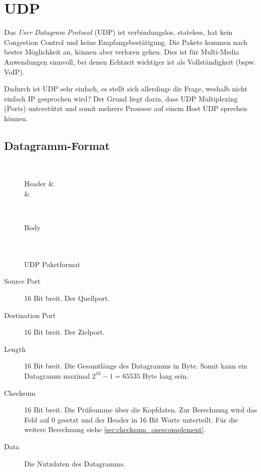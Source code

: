 \documentclass[a4paper, 11pt, accentcolor = tud3b]{tudreport}
\begin{document}
        \section{UDP}
            Das \textit{User Datagram Protocol} (UDP) ist verbindungslos, stateless, hat kein Congestion Control und keine Empfangsbestätigung. Die Pakete kommen nach bester Möglichkeit an, können aber verloren gehen. Dies ist für Multi-Media Anwendungen sinnvoll, bei denen Echtzeit wichtiger ist als Vollständigkeit (bspw. VoIP).
            
            Dadurch ist UDP sehr einfach, es stellt sich allerdings die Frage, weshalb nicht einfach IP gesprochen wird? Der Grund liegt darin, dass UDP Multiplexing (Ports) unterstützt und somit mehrere Prozesse auf einem Host UDP sprechen können.

            \subsection{Datagramm-Format}
	            \begin{figure}[H]
	            	\centering
	            	\begin{bytefield}[bitwidth = 1.2em]{32}
	            		 \\
	            		\begin{rightwordgroup}{Header}
	            			 &  \\
	            			 & 
	            		\end{rightwordgroup} \\
	            		\begin{rightwordgroup}{Body}
		            		 \\
		            		 \\
		            		 \\
	            		\end{rightwordgroup}
	            	\end{bytefield}
	            	\caption{UDP Paketformat}
	            	\label{fig:udp_packet}
	            \end{figure}
	            
	            \begin{description}
	            	\item[Source Port] 16 Bit breit. Der Quellport.
	            	\item[Destination Port] 16 Bit breit. Der Zielport.
	            	\item[Length] 16 Bit breit. Die Gesamtlänge des Datagramms in Byte. Somit kann ein Datagramm maximal \( 2 ^ 16 - 1 = 65535\text{ Byte} \) lang sein.
	            	\item[Checksum] 16 Bit breit. Die Prüfsumme über die Kopfdaten. Zur Berechnung wird das Feld auf 0 gesetzt und der Header in 16 Bit Worte unterteilt. Für die weitere Berechnung siehe \ref{sec:checksum_onescomplement}.
	            	\item[Data] Die Nutzdaten des Datagramms.
	            \end{description}
\end{document}
